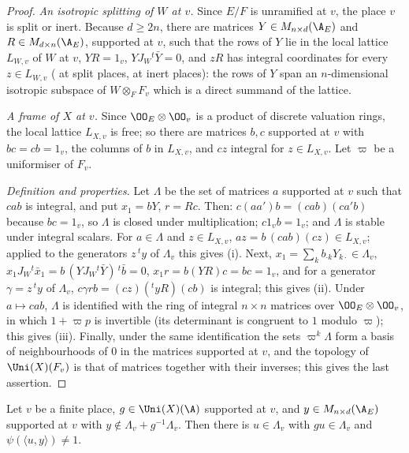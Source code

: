 \begin{proof}
\emph{An isotropic splitting of $W$ at $v$.} Since $E/F$ is unramified at $v$, the place $v$ is split or inert. Because $d\ge2n$,
there are matrices $Y\in M_{n\times d}(\tliftAE)$ and $R\in M_{d\times n}(\tliftAE)$, supported at $v$, such that the rows of $Y$ lie in
the local lattice $L_{W,v}$ of $W$ at $v$, $YR=1_v$, $YJ_W{}^t\bar Y=0$, and $zR$ has integral coordinates for every $z\in L_{W,v}$
( at split places,
 at inert places): the rows of $Y$ span an
$n$-dimensional isotropic subspace of $W\otimes_FF_v$ which is a direct summand of the lattice.

\emph{A frame of $X$ at $v$.} Since $\OO_E\otimes\OO_v$ is a product of discrete valuation rings, the local lattice $L_{X,v}$ is
free; so there are matrices $b,c$ supported at $v$ with $bc=cb=1_v$, the columns of $b$ in $L_{X,v}$, and $cz$ integral for
$z\in L_{X,v}$. Let $\varpi$ be a uniformiser of $F_v$.

\emph{Definition and properties.} Let $\Lambda$ be the set of matrices $a$ supported at $v$ such that $cab$ is integral, and put
$x_1=bY$, $r=Rc$. Then: $c(aa')b=(cab)(ca'b)$ because $bc=1_v$, so $\Lambda$ is closed under multiplication; $c1_vb=1_v$; and
$\Lambda$ is stable under integral scalars. For $a\in\Lambda$ and $z\in L_{X,v}$, $az=b\,(cab)(cz)\in L_{X,v}$; applied to the generators
$z\,{}^ty$ of $\Lambda_v$ this gives (i). Next, $x_1=\sum_kb_{\cdot k}Y_{k\cdot}\in\Lambda_v$, $x_1J_W{}^t\bar x_1=b\,(YJ_W{}^t\bar Y)\,{}^t\bar b=0$,
$x_1r=b(YR)c=bc=1_v$, and for a generator $\gamma=z\,{}^ty$ of $\Lambda_v$, $c\gamma rb=(cz)({}^tyR)(cb)$ is integral; this gives (ii). Under
$a\mapsto cab$, $\Lambda$ is identified with the ring of integral $n\times n$ matrices over $\OO_E\otimes\OO_v$, in which
$1+\varpi p$ is invertible (its determinant is congruent to $1$ modulo $\varpi$); this gives (iii). Finally, under the same
identification the sets $\varpi^k\Lambda$ form a basis of neighbourhoods of $0$ in the matrices supported at $v$, and the
topology of $\Uni(X)(F_v)$ is that of matrices together with their inverses; this gives the last assertion.
\end{proof}

\begin{lemma}[Separation]\label{pf:tlift:separate}
Let $v$ be a finite place, $g\in\Uni(X)(\A)$ supported at $v$, and $y\in M_{n\times d}(\tliftAE)$ supported at $v$ with
$y\notin\Lambda_v+g^{-1}\Lambda_v$. Then there is $u\in\Lambda_v$ with $gu\in\Lambda_v$ and $\psi(\langle u,y\rangle)\ne1$.
\end{lemma}

